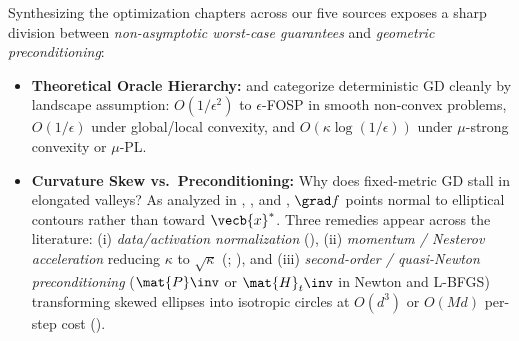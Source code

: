 \documentclass[../../../../master.tex]{subfiles}
\begin{document}
\begin{crossbook}
Synthesizing the optimization chapters across our five sources exposes a sharp division between \emph{non-asymptotic worst-case guarantees} and \emph{geometric preconditioning}:
\begin{itemize}
  \item \textbf{Theoretical Oracle Hierarchy:}  and  categorize deterministic GD cleanly by landscape assumption: $O(1/\epsilon^2)$ to $\epsilon$-FOSP in smooth non-convex problems, $O(1/\epsilon)$ under global/local convexity, and $O(\kappa \log(1/\epsilon))$ under $\mu$-strong convexity or $\mu$-PL.
  \item \textbf{Curvature Skew vs.\ Preconditioning:} Why does fixed-metric GD stall in elongated valleys? As analyzed in , , and , $\grad f$ points normal to elliptical contours rather than toward $\vecb{x}^*$. Three remedies appear across the literature: (i) \emph{data/activation normalization} (), (ii) \emph{momentum / Nesterov acceleration} reducing $\kappa$ to $\sqrt{\kappa}$ (; ), and (iii) \emph{second-order / quasi-Newton preconditioning} ($\mat{P}\inv$ or $\mat{H}_t\inv$ in Newton and L-BFGS) transforming skewed ellipses into isotropic circles at $O(d^3)$ or $O(Md)$ per-step cost ().
\end{itemize}
\end{crossbook}
\end{document}
